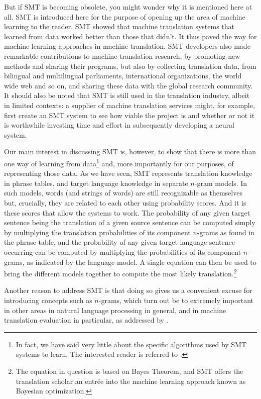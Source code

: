 \documentclass[output=paper]{langscibook}
\begin{document}
But if SMT is becoming obsolete, you might wonder why it is  mentioned here at all. SMT is introduced here for the purpose of opening up the area of machine learning to the reader. SMT showed that machine translation systems that learned from data worked better than those that didn't. It thus paved the way for machine learning approaches in machine translation. SMT developers also made remarkable contributions to machine translation research, by promoting new methods and sharing their programs, but also by collecting translation data, from bilingual and multilingual parliaments, international organizations, the world wide web and so on, and sharing these data with the global research community. It should also be noted that SMT is still used in the translation industry, albeit in limited contexts: a supplier of machine translation services might, for example, first create an SMT system to see how viable the project is and whether or not it is worthwhile investing time and effort in subsequently developing a neural system.  

Our main interest in discussing SMT is, however, to show that there is more than one way of learning from data\footnote{In fact, we have said very little about the specific algorithms used by SMT systems to learn. The interested reader is referred to \citet{Koehn2010}.} and, more importantly for our purposes, of representing those data. As we have seen, SMT represents translation knowledge in phrase tables, and target language knowledge in separate $n$-gram models. In such models, words (and strings of words) are still recognizable as themselves but, crucially, they are related to each other using probability scores. And it is these scores that allow the systems to work. The probability of any given target sentence being the translation of a given source sentence can be computed simply by multiplying the translation probabilities of its component $n$-grams as found in the phrase table, and the probability of any given target-language sentence occurring can be computed by multiplying the probabilities of its component $n$-grams, as indicated by the language model. A single equation can then be used to  bring the different models together to compute the most likely translation.\footnote{The equation in question is based on Bayes Theorem, and SMT offers the translation scholar an entrée into the machine learning approach known as Bayesian optimization.}

Another reason to address SMT is that doing so gives us a convenient excuse for introducing concepts such as $n$-grams, which turn out be to extremely important in other areas in natural language processing in general, and in machine translation evaluation in particular, as addressed by .
\end{document}
